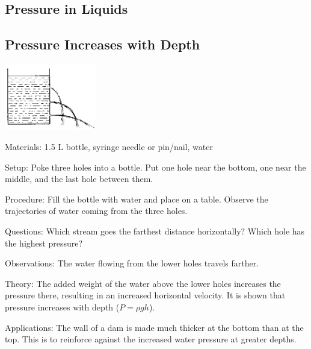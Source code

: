 \begin{multicols}{2}
\vfill
\columnbreak


\section*{Pressure in Liquids} 


\subsection{Pressure Increases with Depth}

\begin{center}
\includegraphics[width=0.3\textwidth]{./img/source/pressure-depth.png}
\end{center}

\begin{description*}
\item[Materials:]{1.5 L bottle, syringe needle or pin/nail, water}
\item[Setup:]{Poke three holes into a bottle. Put one hole near the bottom, one near the middle, and the last hole between them.}
\item[Procedure:]{Fill the bottle with water and place on a table. Observe the trajectories of water coming from the three holes.}
\item[Questions:]{Which stream goes the farthest distance horizontally? Which hole has the highest pressure?}
\item[Observations:]{The water flowing from the lower holes travels farther.}
\item[Theory:]{The added weight of the water above the lower holes increases the pressure there, resulting in an increased horizontal velocity. It is shown that pressure increases with depth ($P = \rho g h$).}
\item[Applications:]{The wall of a dam is made much thicker at the bottom than at the top. This is to reinforce against the increased water pressure at greater depths.}
\end{description*}


\end{multicols}
